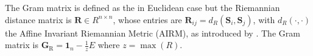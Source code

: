 The Gram matrix is defined as the in Euclidean case but the Riemannian distance matrix is $\boldsymbol{R} \in R^{n\times n}$, whose entries are $\boldsymbol{R}_{ij} = d_R(\boldsymbol{S}_i, \boldsymbol{S}_j)$, with $d_R(\cdot, \cdot)$ the Affine Invariant Riemannian Metric (AIRM), as introduced by \cite{PEN06}.
The Gram matrix is $\boldsymbol{G}_{\mathrm{R}} = \mathbf{1}_n - \frac{1}{z}E$ where $z=\operatorname{max}(R)$.